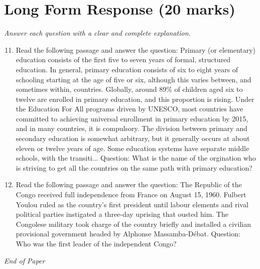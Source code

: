 \documentclass[12pt]{article}
\begin{document}
\section*{Long Form Response (20 marks)}
\textit{Answer each question with a clear and complete explanation.}
\begin{enumerate}[label=\arabic*.]
\setcounter{enumi}{10}
\item Read the following passage and answer the question: Primary (or elementary) education consists of the first five to seven years of formal, structured education. In general, primary education consists of six to eight years of schooling starting at the age of five or six, although this varies between, and sometimes within, countries. Globally, around 89\% of children aged six to twelve are enrolled in primary education, and this proportion is rising. Under the Education For All programs driven by UNESCO, most countries have committed to achieving universal enrollment in primary education by 2015, and in many countries, it is compulsory. The division between primary and secondary education is somewhat arbitrary, but it generally occurs at about eleven or twelve years of age. Some education systems have separate middle schools, with the transiti... Question: What is the name of the orgination who is striving to get all the countries on the same path with primary education?
\item Read the following passage and answer the question: The Republic of the Congo received full independence from France on August 15, 1960. Fulbert Youlou ruled as the country's first president until labour elements and rival political parties instigated a three-day uprising that ousted him. The Congolese military took charge of the country briefly and installed a civilian provisional government headed by Alphonse Massamba-Débat. Question: Who was the first leader of the independent Congo?
\end{enumerate}

\vfill
\noindent\textit{End of Paper}
\end{document}
